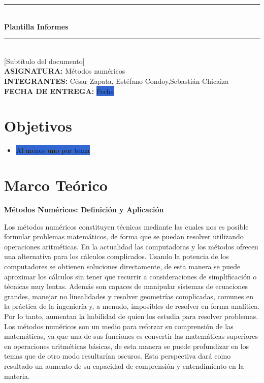 \documentclass[12pt,a4paper]{report}
\begin{document}
\thispagestyle{empty}
\vspace*{2cm}
\begin{center}
    \noindent\rule{\textwidth}{0.4pt}\\[0.5cm]
    {\Huge\bfseries Plantilla Informes}\\[0.5cm]
    \noindent\rule{\textwidth}{0.4pt}\\[0.5cm]
    {\large {\colorbox{white}{[Subtítulo del documento]}}}\\[2cm]
    \textbf{ASIGNATURA:} \hspace{1cm} {Métodos numéricos}\\[0.2cm]
    
    \textbf{INTEGRANTES:} \hspace{1cm} {César Zapata, Estéfano Condoy,Sebastián Chicaiza}\\[2cm]
    
    \textbf{FECHA DE ENTREGA:} \hspace{0.5cm} \colorbox{highlight}{Fecha}
\end{center}
\newpage


\tableofcontents
\thispagestyle{empty}
\newpage

\setcounter{page}{1}

\section*{Objetivos} 
\begin{itemize}
    \item \colorbox{highlight}{Al menos uno por tema}
\end{itemize}

\section*{Marco Teórico}

\textbf{Métodos Numéricos: Definición y Aplicación}

Los métodos numéricos constituyen técnicas mediante las cuales nos es posible formular problemas matemáticos, de forma que se puedan resolver utilizando operaciones aritméticas.
En la actualidad las computadoras y los métodos ofrecen una alternativa para los cálculos complicados. Usando la potencia de los computadores se obtienen soluciones directamente, de esta manera se puede aproximar los cálculos sin tener que recurrir a consideraciones de simplificación o técnicas muy lentas.
Además son capaces de manipular sistemas de ecuaciones grandes, manejar no linealidades y resolver geometrías complicadas, comunes en la práctica de la ingeniería y, a menudo, imposibles de resolver en forma analítica. Por lo tanto, aumentan la habilidad de quien los estudia para resolver problemas.
Los métodos numéricos son un medio para reforzar su comprensión de las matemáticas, ya que una de sus funciones es convertir las matemáticas superiores en operaciones aritméticas básicas, de esta manera se puede profundizar en los temas que de otro modo resultarían oscuros. Esta perspectiva dará como resultado un aumento de su capacidad de comprensión y entendimiento en la materia. \cite{chapra2011metodos}
\end{document}
